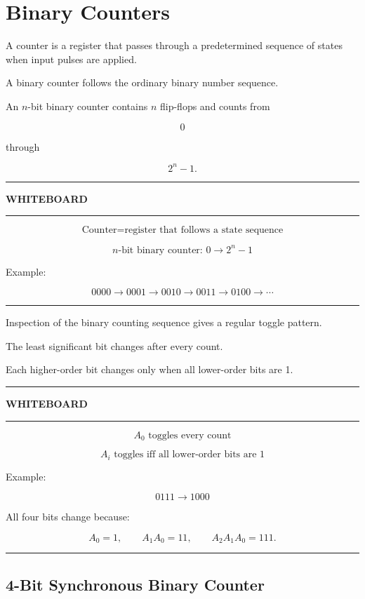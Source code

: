 \documentclass[11pt]{article}
\newenvironment{whiteboard}
{
    \par\medskip
    \hrule
    \vspace{0.35em}
    \noindent\textbf{\large WHITEBOARD}
    \par\vspace{0.3em}
    \hrule
    \vspace{0.65em}
}
{
    \vspace{0.45em}
    \hrule
    \par\medskip
}
\begin{document}
\section{Binary Counters}

A counter is a register that passes through a predetermined sequence of states
when input pulses are applied.

A binary counter follows the ordinary binary number sequence.

An \(n\)-bit binary counter contains \(n\) flip-flops and counts from

\[
0
\]

through

\[
2^n-1.
\]

\begin{whiteboard}

\[
\boxed{
\text{Counter}
=
\text{register that follows a state sequence}
}
\]

\[
\boxed{
n\text{-bit binary counter: }
0\rightarrow2^n-1
}
\]

Example:

\[
0000
\rightarrow
0001
\rightarrow
0010
\rightarrow
0011
\rightarrow
0100
\rightarrow
\cdots
\]

\end{whiteboard}

Inspection of the binary counting sequence gives a regular toggle pattern.

The least significant bit changes after every count.

Each higher-order bit changes only when all lower-order bits are 1.

\begin{whiteboard}

\[
\boxed{
A_0\text{ toggles every count}
}
\]

\[
\boxed{
A_i\text{ toggles iff all lower-order bits are }1
}
\]

Example:

\[
0111
\rightarrow
1000
\]

All four bits change because:

\[
A_0=1,
\qquad
A_1A_0=11,
\qquad
A_2A_1A_0=111.
\]

\end{whiteboard}

\subsection{4-Bit Synchronous Binary Counter}
\end{document}
